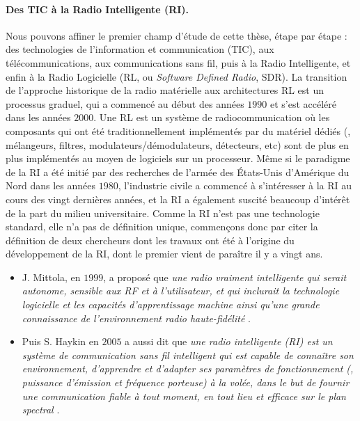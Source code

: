 \begin{resume_fr}
\paragraph{Des TIC à la Radio Intelligente (RI).}
%
Nous pouvons affiner le premier champ d'étude de cette thèse, étape par étape :
des technologies de l'information et communication (TIC), aux télécommunications, aux communications sans fil, puis à la Radio Intelligente,
et enfin à la Radio Logicielle (RL, ou \emph{Software Defined Radio}, SDR).
%
La transition de l'approche historique de la radio matérielle aux architectures RL est un processus graduel, qui a commencé au début des années $1990$ et s'est accéléré dans les années $2000$.
Une RL est un système de radiocommunication où les composants qui ont été traditionnellement implémentés par du matériel dédiés (\eg, mélangeurs, filtres, modulateurs/démodulateurs, détecteurs, etc) sont de plus en plus implémentés au moyen de logiciels sur un processeur.
%
Même si le paradigme de la RI a été initié par des recherches de l'armée des États-Unis d'Amérique du Nord dans les années $1980$, l'industrie civile a commencé à s'intéresser à la RI au cours des vingt dernières années, et la RI a également suscité beaucoup d'intérêt de la part du milieu universitaire.
%
Comme la RI n'est pas une technologie standard, elle n'a pas de définition unique, commençons donc par citer la définition de deux chercheurs dont les travaux ont été à l'origine du développement de la RI, dont le premier vient de paraître il y a vingt ans.
%
\begin{itemize}\tightlist
    \item
    J. Mittola, en $1999$, a proposé que
    \guillemotleft{} \emph{une radio vraiment intelligente qui serait autonome, sensible aux RF et à l'utilisateur, et qui inclurait la technologie logicielle et les capacités d'apprentissage machine ainsi qu'une grande connaissance de l'environnement radio haute-fidélité} \guillemotright{} \cite{Mitola99}.

    \item
    Puis S. Haykin en $2005$ a aussi dit que
    \guillemotleft{} \emph{une radio intelligente (RI) est un système de communication sans fil intelligent qui est capable de connaître son environnement, d'apprendre et d'adapter ses paramètres de fonctionnement (\eg, puissance d'émission et fréquence porteuse) à la volée, dans le but de fournir une communication fiable à tout moment, en tout lieu et efficace sur le plan spectral} \guillemotright{} \cite{Haykin05}.


\end{itemize}
\end{resume_fr}
